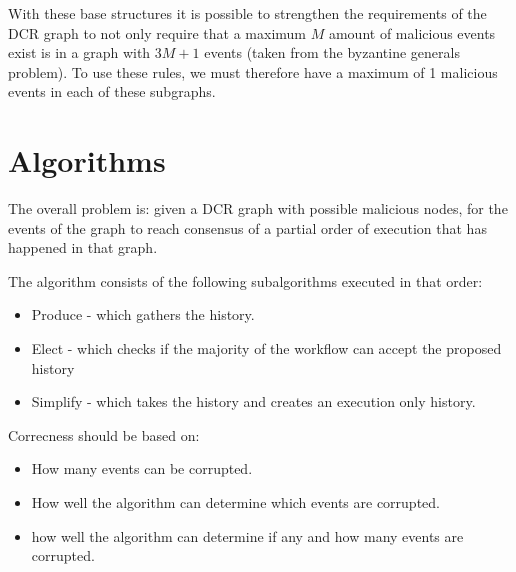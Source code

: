 \newpar With these base structures it is possible to strengthen the requirements of the DCR graph to not only require that a maximum $M$ amount of malicious events exist is in a graph with $3M+1$ events (taken from the byzantine generals problem). To use these rules, we must therefore have a maximum of 1 malicious events in each of these subgraphs.

\chapter{Algorithms}
The overall problem is: given a DCR graph with possible malicious nodes, for the events of the graph to reach consensus of a partial order of execution that has happened in that graph.

The algorithm consists of the following subalgorithms executed in that order:
\begin{itemize}
    \item Produce - which gathers the history.
    \item Elect - which checks if the majority of the workflow can accept the proposed history
    \item Simplify - which takes the history and creates an execution only history.
\end{itemize}

Correcness should be based on:
\begin{itemize}
    \item How many events can be corrupted.
    \item How well the algorithm can determine which events are corrupted.
    \item how well the algorithm can determine if any and how many events are corrupted.
\end{itemize}








